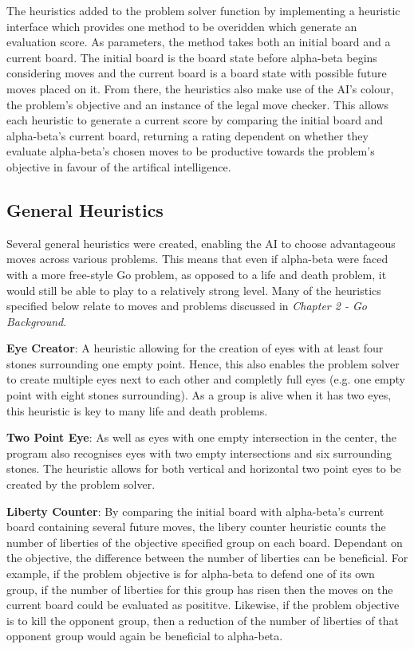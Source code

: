 \documentclass{l3proj}
\begin{document}
The heuristics added to the problem solver function by implementing a heuristic interface which provides one method to be overidden which generate an evaluation score. As parameters, the method takes both an initial board and a current board. The initial board is the board state before alpha-beta begins considering moves and the current board is a board state with possible future moves placed on it. From there, the heuristics also make use of the AI's colour, the problem's objective and an instance of the legal move checker. This allows each heuristic to generate a current score by comparing the initial board and alpha-beta's current board, returning a rating dependent on whether they evaluate alpha-beta's chosen moves to be productive towards the problem's objective in favour of the artifical intelligence.

\subsection{General Heuristics}

Several general heuristics were created, enabling the AI to choose advantageous moves across various problems. This means that even if alpha-beta were faced with a more free-style Go problem, as opposed to a life and death problem, it would still be able to play to a relatively strong level. Many of the heuristics specified below relate to moves and problems discussed in \textit{Chapter 2 - Go Background}.

\textbf{Eye Creator}: A heuristic allowing for the creation of eyes with at least four stones surrounding one empty point. Hence, this also enables the problem solver to create multiple eyes next to each other and completly full eyes (e.g. one empty point with eight stones surrounding). As a group is alive when it has two eyes, this heuristic is key to many life and death problems.

\textbf{Two Point Eye}: As well as eyes with one empty intersection in the center, the program also recognises eyes with two empty intersections and six surrounding stones. The heuristic allows for both vertical and horizontal two point eyes to be created by the problem solver.

\textbf{Liberty Counter}: By comparing the initial board with alpha-beta's current board containing several future moves, the libery counter heuristic counts the number of liberties of the objective specified group on each board. Dependant on the objective, the difference between the number of liberties can be beneficial. For example, if the problem objective is for alpha-beta to defend one of its own group, if the number of liberties for this group has risen then the moves on the current board could be evaluated as posititve. Likewise, if the problem objective is to kill the opponent group, then a reduction of the number of liberties of that opponent group would again be beneficial to alpha-beta.
\end{document}
